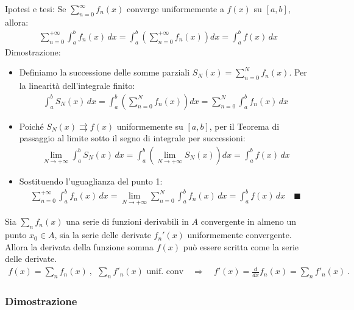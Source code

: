 \documentclass[letterpaper,10pt,italian]{jupyterBook}
\begin{document}
\sphinxAtStartPar
Ipotesi e tesi: Se \(\sum_{n=0}^\infty f_n(x)\) converge uniformemente a \(f(x)\) su \([a,b]\), allora:
\begin{equation*}
\begin{split}\sum_{n=0}^{+\infty} \int_a^b f_n(x) \, dx = \int_a^b \left( \sum_{n=0}^{+\infty} f_n(x) \right) dx = \int_a^b f(x) \, dx\end{split}
\end{equation*}
\sphinxAtStartPar
Dimostrazione:
\begin{itemize}
\item {} 
\sphinxAtStartPar
Definiamo la successione delle somme parziali \(S_N(x) = \sum_{n=0}^N f_n(x)\). Per la linearità dell’integrale finito:
\begin{equation*}
\begin{split}\int_a^b S_N(x) \, dx = \int_a^b \left( \sum_{n=0}^N f_n(x) \right) dx = \sum_{n=0}^N \int_a^b f_n(x) \, dx\end{split}
\end{equation*}
\item {} 
\sphinxAtStartPar
Poiché \(S_N(x) \rightrightarrows f(x)\) uniformemente su \([a,b]\), per il Teorema di passaggio al limite sotto il segno di integrale per successioni:
\begin{equation*}
\begin{split}\lim_{N \to +\infty} \int_a^b S_N(x) \, dx = \int_a^b \left( \lim_{N \to +\infty} S_N(x) \right) dx = \int_a^b f(x) \, dx\end{split}
\end{equation*}
\item {} 
\sphinxAtStartPar
Sostituendo l’uguaglianza del punto 1:
\begin{equation*}
\begin{split}\sum_{n=0}^{+\infty} \int_a^b f_n(x) \, dx = \lim_{N \to +\infty} \sum_{n=0}^N \int_a^b f_n(x) \, dx = \int_a^b f(x) \, dx \quad \blacksquare\end{split}
\end{equation*}
\end{itemize}

\sphinxAtStartPar
{} Sia \(\sum_n f_n(x)\) una serie di funzioni derivabili in \(A\) convergente in almeno un punto \(x_0 \in A\), sia la serie delle derivate \(f_n'(x)\) uniformemente convergente. Allora la derivata della funzione somma \(f(x)\) può essere scritta come la serie delle derivate.
\begin{equation*}
\begin{split}f(x) = \sum_n f_n(x) \ , \ \ \sum_n f'_n(x) \text{ unif. conv} \quad \Rightarrow \quad f'(x) = \frac{d}{dx} f_n(x) = \sum_{n} f'_n(x) \ .\end{split}
\end{equation*}\subsubsection*{Dimostrazione}
\end{document}
